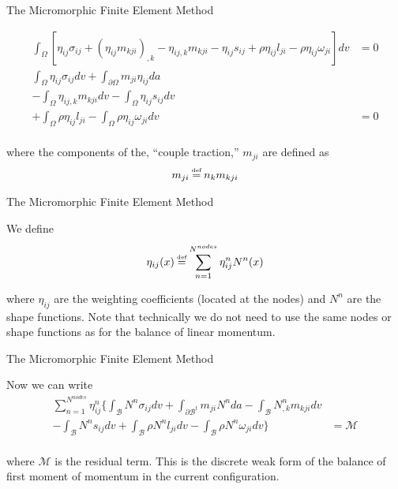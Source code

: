 \documentclass[11pt]{beamer}
\newcommand\defeq{\mathrel{\stackrel{\makebox[0pt]{\mbox{\normalfont\tiny def}}}{=}}}
\begin{document}
\begin{frame}{The Micromorphic Finite Element Method}

\begin{align*}
\int_{\Omega} \left[\eta_{ij} \sigma_{ij} + \left(\eta_{ij} m_{kji}\right)_{,k} - \eta_{ij,k} m_{kji} - \eta_{ij} s_{ij} + \rho \eta_{ij} l_{ji} - \rho \eta_{ij} \omega_{ji} \right] dv&= 0\\
\int_{\Omega} \eta_{ij} \sigma_{ij} dv + \int_{\partial \Omega} m_{ji} \eta_{ij} da&\\
- \int_{\Omega} \eta_{ij,k} m_{kji}dv - \int_{\Omega} \eta_{ij} s_{ij}dv&\\
 + \int_{\Omega} \rho \eta_{ij} l_{ji} - \int_{\Omega} \rho \eta_{ij} \omega_{ji} dv&= 0\\
\end{align*}

where the components of the, ``couple traction,'' $m_{ji}$ are defined as
\begin{align*}
m_{ji} &\defeq n_k m_{kji}\\
\end{align*}

\end{frame}

\begin{frame}{The Micromorphic Finite Element Method}

We define
\begin{align*}
\eta_{ij}(x) &\defeq \sum_{n=1}^{N^{nodes}} \eta_{ij}^n N^n(x)\\
\end{align*}

where $\eta_{ij}$ are the weighting coefficients (located at the nodes) and $N^n$ are the shape functions. Note that technically we do not need to use the same nodes or shape functions as for the balance of linear momentum.

\end{frame}

\begin{frame}{The Micromorphic Finite Element Method}

Now we can write
\begin{align*}
\sum_{n=1}^{N^{nodes}} \eta_{ij}^n \bigg\{\int_{\mathcal{B}} N^n \sigma_{ij} dv + \int_{\partial \mathcal{B}^t} m_{ji} N^n da - \int_{\mathcal{B}} N_{,k}^n m_{kji}dv&\\ - \int_{\mathcal{B}} N^n s_{ij}dv + \int_{\mathcal{B}} \rho N^n l_{ji}dv - \int_{\mathcal{B}} \rho N^n \omega_{ji} dv\bigg\}&= \mathcal{M}\\
\end{align*}

where $\mathcal{M}$ is the residual term. This is the discrete weak form of the balance of first moment of momentum in the current configuration.

\end{frame}
\end{document}
